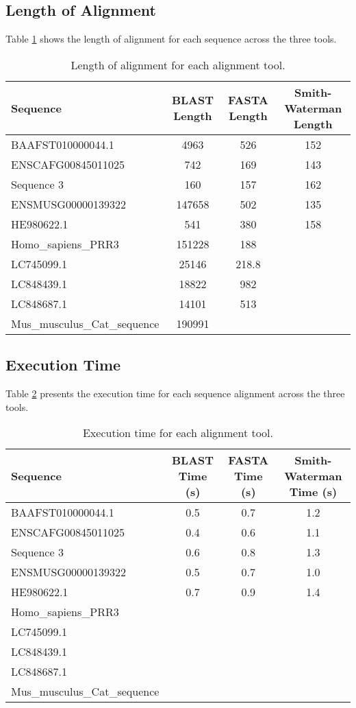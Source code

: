 \documentclass[a4paper,12pt]{article}
\begin{document}
\subsection{Length of Alignment}
Table \ref{table:length} shows the length of alignment for each sequence across the three tools.

\begin{table}[h!]
\centering
\begin{tabular}{|l|c|c|c|}
    \hline
    \textbf{Sequence} & \textbf{BLAST Length} & \textbf{FASTA Length} & \textbf{Smith-Waterman Length} \\
    \hline
    BAAFST010000044.1 & 4963 & 526 & 152 \\
    ENSCAFG00845011025 & 742 & 169 & 143 \\
    Sequence 3 & 160 & 157 & 162 \\
    ENSMUSG00000139322& 147658& 502& 135 \\
    HE980622.1& 541& 380& 158 \\
    Homo_sapiens_PRR3& 151228& 188&\\
    LC745099.1& 25146& 218.8&\\
    LC848439.1& 18822& 982&\\
    LC848687.1& 14101& 513&\\
    Mus_musculus_Cat_sequence& 190991& &\\
    \hline
\end{tabular}
\caption{Length of alignment for each alignment tool.}
\label{table:length}
\end{table}

\subsection{Execution Time}
Table \ref{table:time} presents the execution time for each sequence alignment across the three tools.

\begin{table}[h!]
\centering
\begin{tabular}{|l|c|c|c|}
    \hline
    \textbf{Sequence} & \textbf{BLAST Time (s)} & \textbf{FASTA Time (s)} & \textbf{Smith-Waterman Time (s)} \\
    \hline
    BAAFST010000044.1 & 0.5 & 0.7 & 1.2 \\
    ENSCAFG00845011025 & 0.4 & 0.6 & 1.1 \\
    Sequence 3 & 0.6 & 0.8 & 1.3 \\
    ENSMUSG00000139322& 0.5 & 0.7 & 1.0 \\
    HE980622.1& 0.7 & 0.9 & 1.4 \\
    Homo_sapiens_PRR3& & &\\
    LC745099.1& & &\\
    LC848439.1& & &\\
    LC848687.1& & &\\
    Mus_musculus_Cat_sequence& & &\\
    \hline
\end{tabular}
\caption{Execution time for each alignment tool.}
\label{table:time}
\end{table}
\end{document}
